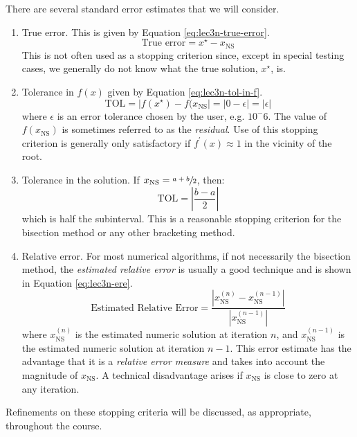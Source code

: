 \vspace{0.25cm}

\noindent There are several standard error estimates that we will consider.

\begin{enumerate}
\item True error.  This is given by Equation \ref{eq:lec3n-true-error}.
\begin{equation}
\text{True error} = x^{\star} - x_{\text{NS}}
\label{eq:lec3n-true-error}
\end{equation}
This is not often used as a stopping criterion since, except in special testing cases, we generally do not know what the true solution, $x^{\star}$, is.

\vspace{3.0cm}

\item Tolerance in $f(x)$ given by Equation \ref{eq:lec3n-tol-in-f}.
\begin{equation}
\text{TOL} = \left| f(x^{\star}) - f(x_{\text{NS}}\right| = \left|0-\epsilon \right| = \left|\epsilon\right|
\label{eq:lec3n-tol-in-f}
\end{equation}
where $\epsilon$ is an error tolerance chosen by the user, e.g. $10^-6$.  The value of $f(x_{\text{NS}})$ is sometimes referred to as the \emph{residual}.  Use of this stopping criterion is generally only satisfactory if $f^{\prime}(x) \approx 1$ in the vicinity of the root.

\item Tolerance in the solution. If $x_{\text{NS}} = \sfrac{a+b}{2}$, then:
\begin{equation*}
\text{TOL} = \left|\frac{b-a}{2} \right|
\end{equation*}
which is half the subinterval.  This is a reasonable stopping criterion for the bisection method or any other bracketing method.  

\item Relative error.  For most numerical algorithms, if not necessarily the bisection method, the \emph{estimated relative error} is usually a good technique and is shown in Equation \ref{eq:lec3n-ere}.
\begin{equation}
\text{Estimated Relative Error} = \frac{\left|x_{\text{NS}}^{(n)} - x_{\text{NS}}^{(n-1)}\right|}{\left|x_{\text{NS}}^{(n-1)}\right|} 
\label{eq:lec3n-ere}
\end{equation}
where $x_{\text{NS}}^{(n)}$ is the estimated numeric solution at iteration $n$, and $x_{\text{NS}}^{(n-1)}$ is the estimated numeric solution at iteration $n-1$.  This error estimate has the advantage that it is a \emph{relative error measure} and takes into account the magnitude of $x_{\text{NS}}$.  A technical disadvantage arises if $x_{\text{NS}}$ is close to zero at any iteration.  
\end{enumerate}
Refinements on these stopping criteria will be discussed, as appropriate, throughout the course.

